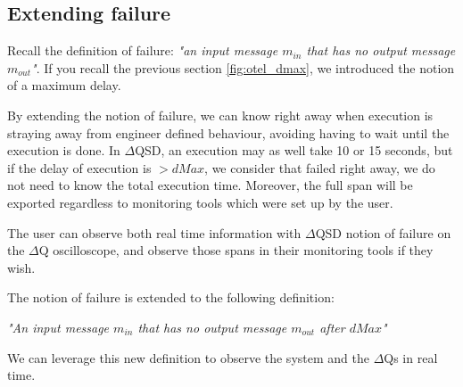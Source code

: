 \subsection{Extending failure}
   Recall the definition of failure: \textit{"an input message $m_{in}$ that has no output message $m_{out}$"}. If you recall the previous section \ref{fig:otel_dmax}, we introduced the notion of a maximum delay. 

   By extending the notion of failure, we can know right away when execution is straying away from engineer defined behaviour, avoiding having to wait until the execution is done. In $\Delta$QSD, an execution may as well take 10 or 15 seconds, but if the delay of execution is $> dMax$, we consider that failed right away, we do not need to know the total execution time. Moreover, the full span will be exported regardless to monitoring tools which were set up by the user. 

   The user can observe both real time information with $\Delta$QSD notion of failure on the $\Delta$Q oscilloscope, and observe those spans in their monitoring tools if they wish.

The notion of failure is extended to the following definition:
        \begin{center}
            \textit{"An input message $m_{in}$ that has no output message $m_{out}$ after $dMax$"} 
        \end{center}
    We can leverage this new definition to observe the system and the $\Delta$Qs in real time.


